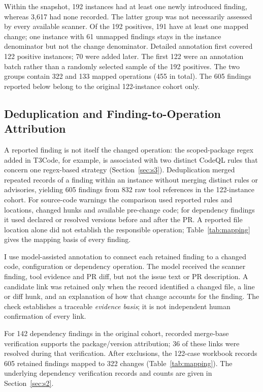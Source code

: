 \documentclass[acmsmall,screen,nonacm]{acmart}
\begin{document}
Within the snapshot, 192 instances had at least one newly introduced finding, whereas 3,617 had none recorded. The latter group was not necessarily assessed by every available scanner. Of the 192 positives, 191 have at least one mapped change; one instance with 61 unmapped findings stays in the instance denominator but not the change denominator. Detailed annotation first covered 122 positive instances; 70 were added later. The first 122 were an annotation batch rather than a randomly selected sample of the 192 positives. The two groups contain 322 and 133 mapped operations (455 in total). The 605 findings reported below belong to the original 122-instance cohort only.

\subsection{Deduplication and Finding-to-Operation Attribution}\label{sec:attrib}

A reported finding is not itself the changed operation: the scoped-package regex added in T3Code, for example, is associated with two distinct CodeQL rules that concern one regex-based strategy (Section~\ref{sec:s3}). Deduplication merged repeated records of a finding within an instance without merging distinct rules or advisories, yielding 605 findings from 832 raw tool references in the 122-instance cohort. For source-code warnings the comparison used reported rules and locations, changed hunks and available pre-change code; for dependency findings it used declared or resolved versions before and after the PR. A reported file location alone did not establish the responsible operation; Table~\ref{tab:mapping} gives the mapping basis of every finding.

I use model-assisted annotation to connect each retained finding to a changed code, configuration or dependency operation. The model received the scanner finding, tool evidence and PR diff, but not the issue text or PR description. A candidate link was retained only when the record identified a changed file, a line or diff hunk, and an explanation of how that change accounts for the finding. The check establishes a traceable \emph{evidence basis}; it is not independent human confirmation of every link.

For 142 dependency findings in the original cohort, recorded merge-base verification supports the package/version attribution; 36 of these links were resolved during that verification. After exclusions, the 122-case workbook records 605 retained findings mapped to 322 changes (Table~\ref{tab:mapping}). The underlying dependency verification records and counts are given in Section~\ref{sec:s2}.
\end{document}
